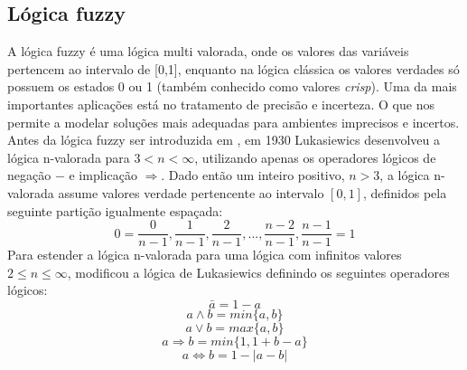 \subsection{Lógica fuzzy}

A lógica fuzzy é uma lógica multi valorada, onde os valores das variáveis pertencem ao intervalo de
[0,1], enquanto na lógica clássica os valores verdades só possuem os estados 0 ou 1 (também
conhecido como valores {\it crisp\/}). Uma da mais importantes aplicações está no tratamento de
precisão e incerteza. O que nos permite a modelar soluções mais adequadas para ambientes imprecisos
e incertos.  Antes da lógica fuzzy ser introduzida em \cite{Zadeh1965}, em 1930
Lukasiewics\cite{Chen2000} desenvolveu a lógica n-valorada para $3 < n < \infty$, utilizando apenas
os operadores lógicos de negação $-$ e implicação $\Rightarrow$. Dado então um inteiro positivo, $n
> 3$, a lógica n-valorada assume valores verdade pertencente ao intervalo $[0,1]$, definidos pela
seguinte partição igualmente espaçada: $$0 =  \frac{0}{n-1},
\frac{1}{n-1},\frac{2}{n-1},...,\frac{n-2}{n-1},\frac{n-1}{n-1} = 1$$ Para estender a lógica
n-valorada para uma lógica com infinitos valores $2 \leq n \leq \infty$, \cite{Zadeh1965} modificou
a lógica de Lukasiewics definindo os seguintes operadores lógicos: $$\bar{a} = 1 -a$$ $$a \wedge b =
min\{a,b\}$$ $$a \vee b = max\{a,b\}$$ $$a \Rightarrow b = min\{1, 1+b-a\}$$ $$a \Leftrightarrow  b
= 1 - |a-b|$$

